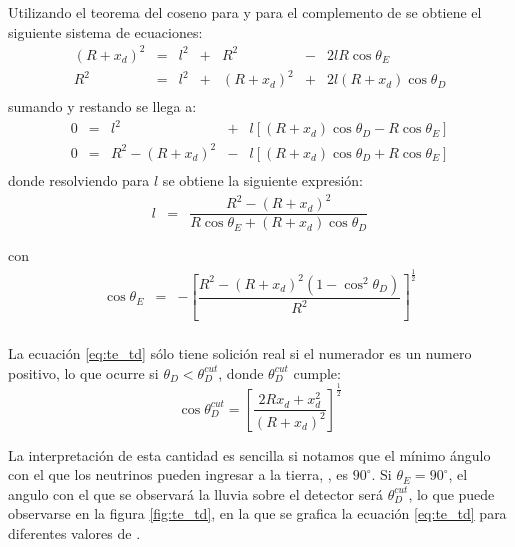 	Utilizando el teorema del coseno para \te{} y para el complemento de \td{} se obtiene el siguiente sistema de ecuaciones:	
	\begin{displaymath}
		\begin{array}{rcccccl}
		(R+x_d)^2 & = & l^2 & + & R^2 & - & 2 l R \cos \theta_E \\
		R^2 & = & l^2 & + & (R+x_d)^2 & + & 2 l (R+x_d) \cos \theta_D \\
		\end{array}
	\end{displaymath}
	sumando y restando se llega a:
	\begin{displaymath}
		\begin{array}{rcccl}
		0 & = & l^2 &+ & l \left[ (R+x_d) \cos \theta_D - R \cos \theta_E \right] \\
		0 & = & R^2 - (R+x_d)^2 & - & l \left[ (R+x_d) \cos \theta_D + R \cos \theta_E \right] \\
		\end{array}
	\end{displaymath}
	donde resolviendo para $l$ se obtiene la siguiente expresi\'on:
	\begin{equation}
		\begin{array}{rcl}
		l & = & \dfrac{R^2-(R+x_d)^2}{R \cos \theta_E + (R+x_d) \cos \theta_D}\\
		&&\\
		\end{array}
		\label{eq:l_curve}
	\end{equation}
	con
	\begin{equation}
		\begin{array}{rcl}
		\cos \theta_E & = & - \left[ \dfrac{R^2 - (R+x_d)^2 (1-\cos^2 \theta_D)}{R^2} \right]^{\frac{1}{2}} \\ 
		\end{array}
		\label{eq:te_td}
	\end{equation}
	
	La ecuaci\'on \ref{eq:te_td} s\'olo tiene solici\'on real si el numerador es un numero positivo, lo que ocurre si $\theta_D<\theta_D^{cut}$, donde $\theta_D^{cut}$ cumple:
	\begin{equation}
	\cos \theta_D^{cut} = \left[ \frac{2 R x_d+x_d^2}{(R+x_d)^2} \right]^{\frac{1}{2}}
	\label{eq:tdc}
	\end{equation}
	
	La interpretaci\'on de esta cantidad es sencilla si notamos que el m\'inimo \'angulo con el que los neutrinos pueden ingresar a la tierra, \te{}, es $90^\circ$. 
	Si $\theta_E=90^\circ$, el angulo con el que se observar\'a la lluvia sobre el detector ser\'a $\theta_D^{cut}$, lo que puede observarse en la figura \ref{fig:te_td}, en la que se grafica la ecuaci\'on \ref{eq:te_td} para diferentes valores de \xd{}.
	
